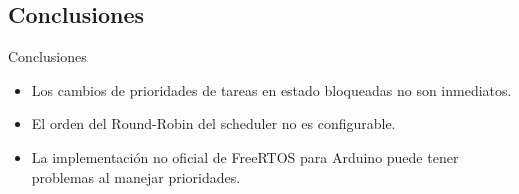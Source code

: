 \subsection{Conclusiones}
\begin{frame}
	\begin{block}{Conclusiones}
		\begin{itemize}
			\item Los cambios de prioridades de tareas en estado bloqueadas no son inmediatos.
			\item El orden del Round-Robin del scheduler no es configurable.
			\item La implementación no oficial de FreeRTOS para Arduino puede tener problemas al manejar prioridades.
		\end{itemize}
	\end{block}
\end{frame}